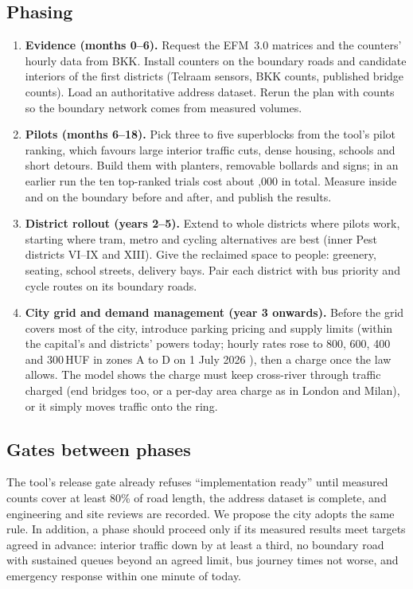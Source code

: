\documentclass[11pt,a4paper]{article}
\begin{document}
\subsection{Phasing}
\begin{enumerate}
  \item \textbf{Evidence (months 0--6).} Request the EFM~3.0 matrices and the counters' hourly data from BKK. Install counters on the boundary roads and candidate interiors of the first districts (Telraam sensors, BKK counts, published bridge counts). Load an authoritative address dataset. Rerun the plan with counts so the boundary network comes from measured volumes.
  \item \textbf{Pilots (months 6--18).} Pick three to five superblocks from the tool's pilot ranking, which favours large interior traffic cuts, dense housing, schools and short detours. Build them with planters, removable bollards and signs; in an earlier run the ten top-ranked trials cost about ,000 in total. Measure inside and on the boundary before and after, and publish the results.
  \item \textbf{District rollout (years 2--5).} Extend to whole districts where pilots work, starting where tram, metro and cycling alternatives are best (inner Pest districts VI--IX and XIII). Give the reclaimed space to people: greenery, seating, school streets, delivery bays. Pair each district with bus priority and cycle routes on its boundary roads.
  \item \textbf{City grid and demand management (year 3 onwards).} Before the grid covers most of the city, introduce parking pricing and supply limits (within the capital's and districts' powers today; hourly rates rose to 800, 600, 400 and 300\,HUF in zones A to D on 1 July 2026 \citep{telex2026}), then a charge once the law allows. The model shows the charge must keep cross-river through traffic charged (end bridges too, or a per-day area charge as in London and Milan), or it simply moves traffic onto the ring.
\end{enumerate}

\subsection{Gates between phases}
The tool's release gate already refuses ``implementation ready'' until measured counts cover at least 80\% of road length, the address dataset is complete, and engineering and site reviews are recorded. We propose the city adopts the same rule. In addition, a phase should proceed only if its measured results meet targets agreed in advance: interior traffic down by at least a third, no boundary road with sustained queues beyond an agreed limit, bus journey times not worse, and emergency response within one minute of today.
\end{document}
